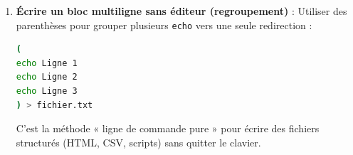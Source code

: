 \documentclass[11pt]{article}
\begin{document}
\begin{methode}
\begin{enumerate}
\begin{itemize}
        \item \texttt{>} : redirige la sortie standard (STDOUT) vers un fichier (écrase).
        \item \texttt{>>} : redirige en mode ajout (append).
        \item \texttt{<} : redirige l'entrée standard (STDIN) depuis un fichier (ex. \texttt{more < fichier.txt}).
        \item \texttt{|} (pipe) : connecte la sortie d'une commande à l'entrée de la suivante (ex. \texttt{dir | more}, \texttt{dir /s | find "txt"}).
    \end{itemize}
    \item \textbf{Écrire un bloc multiligne sans éditeur (regroupement)} : Utiliser des parenthèses pour grouper plusieurs \texttt{echo} vers une seule redirection :
    \begin{lstlisting}[language=bash]
(
echo Ligne 1
echo Ligne 2
echo Ligne 3
) > fichier.txt
    \end{lstlisting}
    C'est la méthode « ligne de commande pure » pour écrire des fichiers structurés (HTML, CSV, scripts) sans quitter le clavier.
\end{enumerate}
\end{methode}
\end{document}
